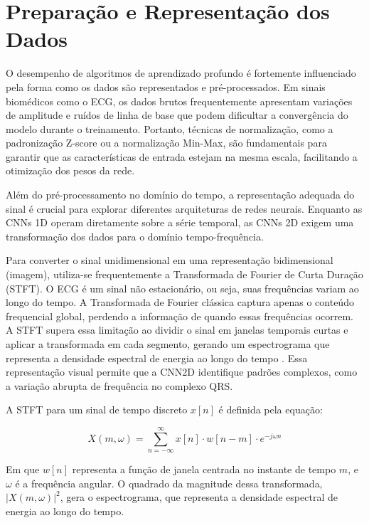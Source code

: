 \section{Preparação e Representação dos Dados}

O desempenho de algoritmos de aprendizado profundo é fortemente influenciado pela forma como os dados são representados e pré-processados. Em sinais 
biomédicos como o ECG, os dados brutos frequentemente apresentam variações de amplitude e ruídos de linha de base que podem dificultar a convergência 
do modelo durante o treinamento. Portanto, técnicas de normalização, como a padronização Z-score ou a normalização Min-Max, são fundamentais para 
garantir que as características de entrada estejam na mesma escala, facilitando a otimização dos pesos da rede.

Além do pré-processamento no domínio do tempo, a representação adequada do sinal é crucial para explorar diferentes arquiteturas de redes neurais. 
Enquanto as CNNs 1D operam diretamente sobre a série temporal, as CNNs 2D exigem uma transformação dos dados para o domínio tempo-frequência.

Para converter o sinal unidimensional em uma representação bidimensional (imagem), utiliza-se frequentemente a Transformada de Fourier de Curta 
Duração (STFT). O ECG é um sinal não estacionário, ou seja, suas frequências variam ao longo do tempo. A Transformada de Fourier clássica captura 
apenas o conteúdo frequencial global, perdendo a informação de quando essas frequências ocorrem. A STFT supera essa limitação ao dividir o sinal 
em janelas temporais curtas e aplicar a transformada em cada segmento, gerando um espectrograma que representa a densidade espectral de energia ao 
longo do tempo . Essa representação visual permite que a CNN2D identifique padrões complexos, como a variação abrupta de 
frequência no complexo QRS.

A STFT para um sinal de tempo discreto $x[n]$ é definida pela equação:

\begin{equation}
    \label{eq: eq3}
    X(m, \omega) = \sum_{n=-\infty}^{\infty} x[n] \cdot w[n-m] \cdot e^{-j\omega n}
\end{equation}

Em que $w[n]$ representa a função de janela centrada no instante de tempo $m$, e $\omega$ é a frequência angular. O quadrado da 
magnitude dessa transformada, $|X(m, \omega)|^2$, gera o espectrograma, que representa a densidade espectral de energia ao longo do 
tempo.

